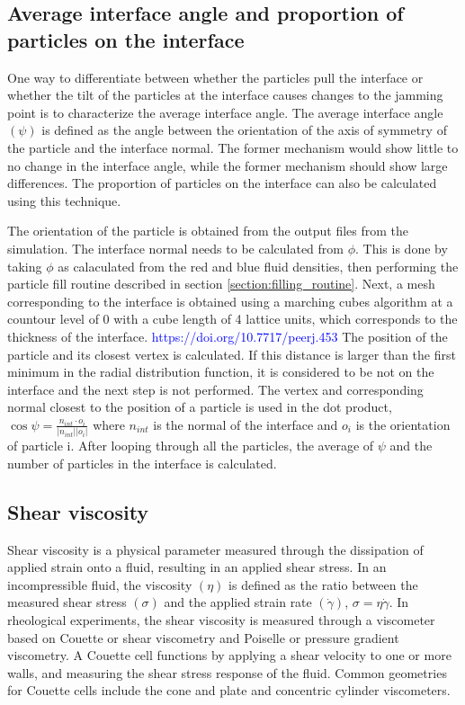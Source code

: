 \subsection{Average interface angle and proportion of particles on the interface}

One way to differentiate between whether the particles pull the interface or whether the tilt of the particles at the interface causes changes to the jamming point is to characterize the average interface angle. The average interface angle $(\psi)$ is defined as the angle between the orientation of the axis of symmetry of the particle and the interface normal. The former mechanism would show little to no change in the interface angle, while the former mechanism should show large differences. The proportion of particles on the interface can also be calculated using this technique. 

The orientation of the particle is obtained from the output files from the simulation. The interface normal needs to be calculated from $\phi$. This is done by taking $\phi$ as calaculated from the red and blue fluid densities, then performing the particle fill routine described in section \ref{section:filling_routine}. Next, a mesh corresponding to the interface is obtained using a marching cubes algorithm at a countour level of 0 with a cube length of 4 lattice units, which corresponds to the thickness of the interface. \textcolor{blue}{https://doi.org/10.7717/peerj.453} The position of the particle and its closest vertex is calculated. If this distance is larger than the first minimum in the radial distribution function, it is considered to be not on the interface and the next step is not performed. The vertex and corresponding normal closest to the position of a particle is used in the dot product, $\cos{\psi} = \frac{n_{int} \cdot o_{i}}{|n_{int}| |o_i|}$ where $n_{int}$ is the normal of the interface and $o_i$ is the orientation of particle i. After looping through all the particles, the average of $\psi$ and the number of particles in the interface is calculated.

\subsection{Shear viscosity}
\label{section:shear_viscosity}

Shear viscosity is a physical parameter measured through the dissipation of applied strain onto a fluid, resulting in an applied shear stress. In an incompressible fluid, the viscosity $(\eta)$ is defined as the ratio between the measured shear stress $(\sigma)$ and the applied strain rate $(\dot{\gamma})$, $\sigma = \eta \dot{\gamma}$. In rheological experiments, the shear viscosity is measured through a viscometer based on Couette or shear viscometry and Poiselle or pressure gradient viscometry. A Couette cell functions by applying a shear velocity to one or more walls, and measuring the shear stress response of the fluid. Common geometries for Couette cells include the cone and plate and concentric cylinder viscometers. 

